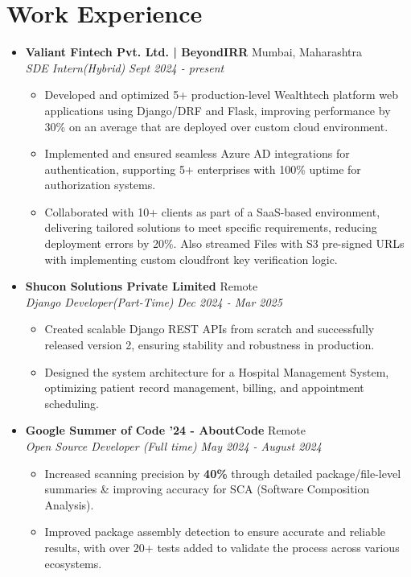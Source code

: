 \documentclass[a4,10pt]{article}
\begin{document}
\section{Work Experience}
\begin{itemize}[leftmargin=*]

\item \textbf{Valiant Fintech Pvt. Ltd. | BeyondIRR}  \hfill {Mumbai, Maharashtra} \\
\textit{SDE Intern(Hybrid)}  \hfill \textit{Sept 2024 - present}
\begin{itemize}[label=$\diamond$]
    \item Developed and optimized 5+ production-level Wealthtech platform web applications using Django/DRF and Flask, improving performance by 30\% on an average that are deployed over custom cloud environment.
    \item Implemented and ensured seamless Azure AD integrations for authentication, supporting 5+ enterprises with 100\% uptime for authorization systems.
    \item Collaborated with 10+ clients as part of a SaaS-based environment, delivering tailored solutions to meet specific requirements, reducing deployment errors by 20\%. Also streamed Files with S3 pre-signed URLs with implementing custom cloudfront key verification logic.
\end{itemize}

\item \textbf{Shucon Solutions Private Limited}  \hfill {Remote} \\
\textit{Django Developer(Part-Time)}  \hfill \textit{Dec 2024 - Mar 2025}
\begin{itemize}[label=$\diamond$]
    \item Created scalable Django REST APIs from scratch and successfully released version 2, ensuring stability and robustness in production.  
    \item Designed the system architecture for a Hospital Management System, optimizing patient record management, billing, and appointment scheduling.  
\end{itemize}

\item \textbf{Google Summer of Code '24 - AboutCode}  \hfill {Remote} \\
\textit{Open Source Developer (Full time)}  \hfill \textit{May 2024 - August 2024}
\begin{itemize}[label=$\diamond$]
    \item  Increased scanning precision by \textbf{40\%} through detailed package/file-level summaries \& improving accuracy for SCA (Software Composition Analysis).
    \item Improved package assembly detection to ensure accurate and reliable results, with over 20+ tests added to validate the process across various ecosystems.


\end{itemize}
\end{itemize}
\end{document}
